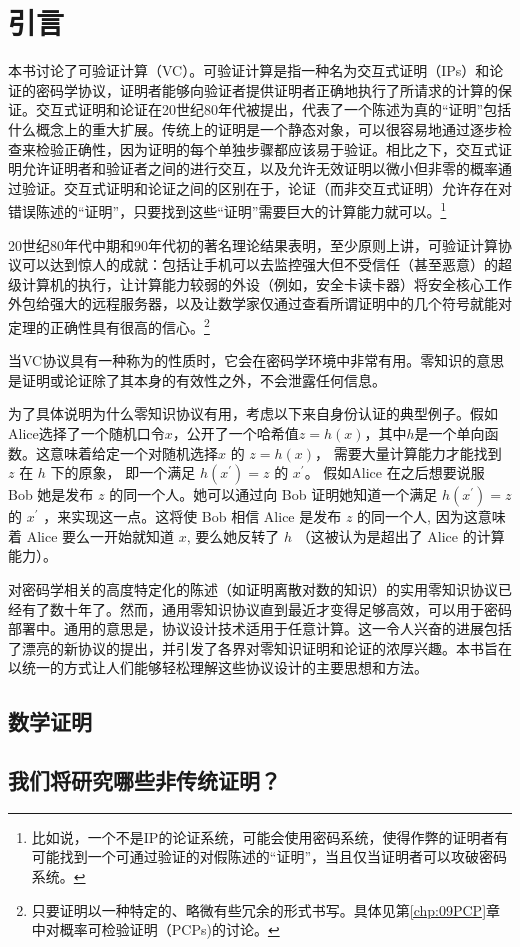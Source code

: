 
\chapter{引言}\label{chp:01Introduction}


本书讨论了可验证计算（VC）。可验证计算是指一种名为交互式证明（IPs）和论证的密码学协议，证明者能够向验证者提供证明者正确地执行了所请求的计算的保证。交互式证明和论证在20世纪80年代被提出，代表了一个陈述为真的“证明”包括什么概念上的重大扩展。传统上的证明是一个静态对象，可以很容易地通过逐步检查来检验正确性，因为证明的每个单独步骤都应该易于验证。相比之下，交互式证明允许证明者和验证者之间的进行交互，以及允许无效证明以微小但非零的概率通过验证。交互式证明和论证之间的区别在于，论证（而非交互式证明）允许存在对错误陈述的“证明”，只要找到这些“证明”需要巨大的计算能力就可以。\footnote{比如说，一个不是IP的论证系统，可能会使用密码系统，使得作弊的证明者有可能找到一个可通过验证的对假陈述的“证明”，当且仅当证明者可以攻破密码系统。}

20世纪80年代中期和90年代初的著名理论结果表明，至少原则上讲，可验证计算协议可以达到惊人的成就：包括让手机可以去监控强大但不受信任（甚至恶意）的超级计算机的执行，让计算能力较弱的外设（例如，安全卡读卡器）将安全核心工作外包给强大的远程服务器，以及让数学家仅通过查看所谓证明中的几个符号就能对定理的正确性具有很高的信心。\footnote{只要证明以一种特定的、略微有些冗余的形式书写。具体见第\ref{chp:09PCP}章中对概率可检验证明（PCPs)的讨论。}


当VC协议具有一种称为的性质时，它会在密码学环境中非常有用。零知识的意思是证明或论证除了其本身的有效性之外，不会泄露任何信息。

为了具体说明为什么零知识协议有用，考虑以下来自身份认证的典型例子。假如Alice选择了一个随机口令$x$，公开了一个哈希值$z=h(x)$，其中$h$是一个单向函数。这意味着给定一个对随机选择$x$ 的 $z=h(x)$， 需要大量计算能力才能找到 $z$ 在 $h$ 下的原象， 即一个满足 $h\left(x^{\prime}\right)=z$ 的 $x^{\prime}$。 假如Alice 在之后想要说服 Bob 她是发布 $z$ 的同一个人。她可以通过向 Bob 证明她知道一个满足 $h\left(x^{\prime}\right)=z$ 的 $x^{\prime}$ ，来实现这一点。这将使 Bob 相信 Alice 是发布 $z$ 的同一个人, 因为这意味着 Alice 要么一开始就知道 $x$, 要么她反转了 $h$ （这被认为是超出了 Alice 的计算能力）。



对密码学相关的高度特定化的陈述（如证明离散对数的知识\cite{Sch89}）的实用零知识协议已经有了数十年了。然而，通用零知识协议直到最近才变得足够高效，可以用于密码部署中。通用的意思是，协议设计技术适用于任意计算。这一令人兴奋的进展包括了漂亮的新协议的提出，并引发了各界对零知识证明和论证的浓厚兴趣。本书旨在以统一的方式让人们能够轻松理解这些协议设计的主要思想和方法。



\section{数学证明}
\section{我们将研究哪些非传统证明？}
